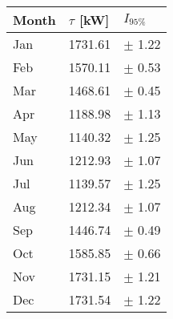 \begin{tabular}{lll}
\toprule
Month & $\tau$ [kW] &  $I_{95\%}$ \\
\midrule
  Jan &     1731.61 &  $\pm$ 1.22 \\
  Feb &     1570.11 &  $\pm$ 0.53 \\
  Mar &     1468.61 &  $\pm$ 0.45 \\
  Apr &     1188.98 &  $\pm$ 1.13 \\
  May &     1140.32 &  $\pm$ 1.25 \\
  Jun &     1212.93 &  $\pm$ 1.07 \\
  Jul &     1139.57 &  $\pm$ 1.25 \\
  Aug &     1212.34 &  $\pm$ 1.07 \\
  Sep &     1446.74 &  $\pm$ 0.49 \\
  Oct &     1585.85 &  $\pm$ 0.66 \\
  Nov &     1731.15 &  $\pm$ 1.21 \\
  Dec &     1731.54 &  $\pm$ 1.22 \\
\bottomrule
\end{tabular}
